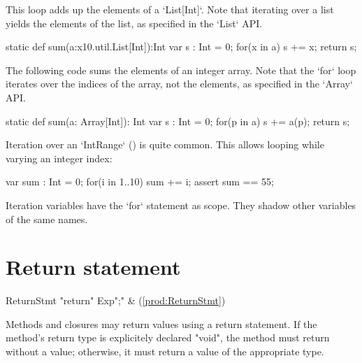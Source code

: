 \begin{ex}
This loop adds up the elements of a \xcd`List[Int]`.
Note that iterating over a list yields the elements of the list, as specified
in the \xcd`List` API. 
\begin{xten}
static def sum(a:x10.util.List[Int]):Int {
  var s : Int = 0;
  for(x in a) s += x;
  return s;
}
\end{xten}

The following code sums the elements of an integer array.  Note that the
\xcd`for` loop iterates over the indices of the array, not the elements, as
specified in the \xcd`Array` API.  
\begin{xten}
static def sum(a: Array[Int]): Int {
  var s : Int = 0;
  for(p in a) s += a(p);
  return s;
}
\end{xten}

Iteration over an \xcd`IntRange` () is quite common. This
allows looping while varying an integer index: 
\begin{xten}
var sum : Int = 0;
for(i in 1..10) sum += i;
assert sum == 55;
\end{xten}


\end{ex}

Iteration variables have the \xcd`for` statement as scope.  They shadow other
variables of the same names.


\section{Return statement}
\label{ReturnStatement}

\begin{bbgrammar}
          ReturnStmt \: \xcd"return" Exp\opt \xcd";" & (\ref{prod:ReturnStmt}) \\
\end{bbgrammar}

Methods and closures may return values using a return statement.
If the method's return type is explicitely declared \xcd"void",
the method must return without a value; otherwise, it must return
a value of the appropriate type.


